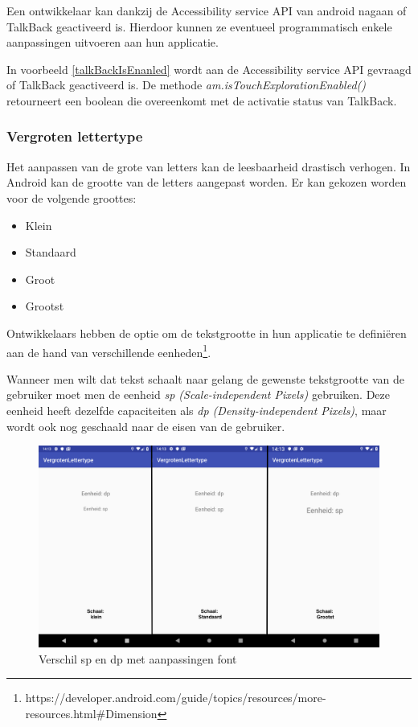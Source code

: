 Een ontwikkelaar kan dankzij de Accessibility service API van android nagaan of TalkBack geactiveerd is. Hierdoor kunnen ze eventueel programmatisch enkele aanpassingen uitvoeren aan hun applicatie.


In voorbeeld \ref{talkBackIsEnanled} wordt aan de Accessibility service \gls{API} gevraagd of TalkBack geactiveerd is. De methode \emph{am.isTouchExplorationEnabled()} retourneert een boolean die overeenkomt met de activatie status van TalkBack.


\subsubsection{Vergroten lettertype}
\label{subsec:androidSchalenTekst}
Het aanpassen van de grote van letters kan de leesbaarheid drastisch verhogen. In Android kan de grootte van de letters aangepast worden.
Er kan gekozen worden voor de volgende groottes:
\begin{itemize}
    \item Klein
    \item Standaard
    \item Groot
    \item Grootst
\end{itemize}

Ontwikkelaars hebben de optie om de tekstgrootte in hun applicatie te definiëren aan de hand van verschillende eenheden\footnote{https://developer.android.com/guide/topics/resources/more-resources.html\#Dimension}.

Wanneer men wilt dat tekst schaalt naar gelang de gewenste tekstgrootte van de gebruiker moet men de eenheid \emph{sp (Scale-independent Pixels)} gebruiken. Deze eenheid heeft dezelfde capaciteiten als \emph{dp (Density-independent Pixels)}, maar wordt ook nog geschaald naar de eisen van de gebruiker.
\begin{figure}[h!]
    \centering
    \includegraphics[width=0.8\linewidth]{img/Android_Scale_font}
    \caption{Verschil sp en dp met aanpassingen font}
    \label{fig:androidscalefont}
\end{figure}

